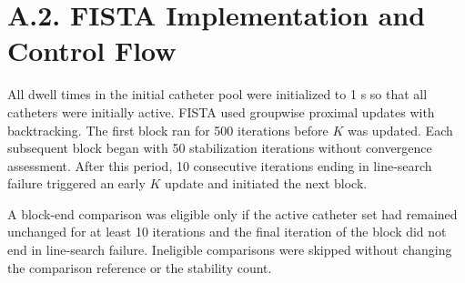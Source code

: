 \documentclass[12pt,twoside,letterpaper]{article}
\newcounter{algorithm}
\begin{document}
\raggedbottom


\linenumbers

\section*{A.2. FISTA Implementation and Control Flow}

\renewcommand{\thealgorithm}{A\arabic{algorithm}}

All dwell times in the initial catheter pool were initialized to 1 s so that all catheters were initially active. FISTA used groupwise proximal updates with backtracking. The first block ran for 500 iterations before $K$ was updated. Each subsequent block began with 50 stabilization iterations without convergence assessment. After this period, 10 consecutive iterations ending in line-search failure triggered an early $K$ update and initiated the next block.

A block-end comparison was eligible only if the active catheter set had remained unchanged for at least 10 iterations and the final iteration of the block did not end in line-search failure. Ineligible comparisons were skipped without changing the comparison reference or the stability count.
\end{document}
